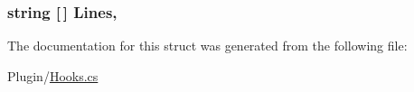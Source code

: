 \subsubsection[{Lines}]{\setlength{\rightskip}{0pt plus 5cm}string \mbox{[}$\,$\mbox{]} Lines\hspace{0.3cm}{\ttfamily [get]}, {\ttfamily [set]}}\label{structOTA_1_1Plugin_1_1HookArgs_1_1DisconnectReceived_a35ecc63f81998013f2813b6f27480609}


The documentation for this struct was generated from the following file\+:\begin{DoxyCompactItemize}
\item 
Plugin/\hyperlink{Hooks_8cs}{Hooks.\+cs}\end{DoxyCompactItemize}
